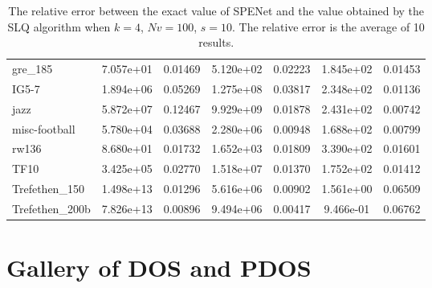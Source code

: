 \documentclass[senior,final,11pt]{iscs-thesis}
\begin{document}
\begin{table}[htb]
\begin{center}
{\begin{tabular}{l | c c | c c | c c }
        gre\_185 & 7.057e+01 & 0.01469 & 5.120e+02 & 0.02223 & 1.845e+02 & 0.01453\\
        IG5-7 & 1.894e+06 & 0.05269 & 1.275e+08 & 0.03817 & 2.348e+02 & 0.01136\\
        jazz & 5.872e+07 & 0.12467 & 9.929e+09 & 0.01878 & 2.431e+02 & 0.00742\\
        misc-football & 5.780e+04 & 0.03688 & 2.280e+06 & 0.00948 & 1.688e+02 & 0.00799\\
        rw136 & 8.680e+01 & 0.01732 & 1.652e+03 & 0.01809 & 3.390e+02 & 0.01601\\
        TF10 & 3.425e+05 & 0.02770 & 1.518e+07 & 0.01370 & 1.752e+02 & 0.01412\\
        Trefethen\_150 & 1.498e+13 & 0.01296 & 5.616e+06 & 0.00902 & 1.561e+00 & 0.06509\\
        Trefethen\_200b & 7.826e+13 & 0.00896 & 9.494e+06 & 0.00417 & 9.466e-01 & 0.06762\\
      \end{tabular}
      }
      \caption{The relative error between the exact value of SPENet and the value obtained by the SLQ algorithm when $k=4$, $Nv = 100$, $s= 10$. The relative error is the average of 10 results.}
      \label{tab:rel_error_k4}
    \end{center}
  \end{table}


\chapter{Gallery of DOS and PDOS}
\end{document}
